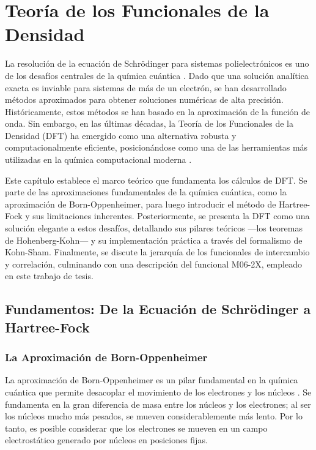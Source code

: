 
\chapter{Teoría de los Funcionales de la Densidad}
\label{chap:dft}

La resolución de la ecuación de Schrödinger para sistemas polielectrónicos es uno de los desafíos centrales de la química cuántica \cite[68]{szabo1996modern}. Dado que una solución analítica exacta es inviable para sistemas de más de un electrón, se han desarrollado métodos aproximados para obtener soluciones numéricas de alta precisión. Históricamente, estos métodos se han basado en la aproximación de la función de onda. Sin embargo, en las últimas décadas, la Teoría de los Funcionales de la Densidad (DFT) ha emergido como una alternativa robusta y computacionalmente eficiente, posicionándose como una de las herramientas más utilizadas en la química computacional moderna \cite[6]{koch2015chemist}.

Este capítulo establece el marco teórico que fundamenta los cálculos de DFT. Se parte de las aproximaciones fundamentales de la química cuántica, como la aproximación de Born-Oppenheimer, para luego introducir el método de Hartree-Fock y sus limitaciones inherentes. Posteriormente, se presenta la DFT como una solución elegante a estos desafíos, detallando sus pilares teóricos —los teoremas de Hohenberg-Kohn— y su implementación práctica a través del formalismo de Kohn-Sham. Finalmente, se discute la jerarquía de los funcionales de intercambio y correlación, culminando con una descripción del funcional M06-2X, empleado en este trabajo de tesis.

\section{Fundamentos: De la Ecuación de Schrödinger a Hartree-Fock}

\subsection{La Aproximación de Born-Oppenheimer}
La aproximación de Born-Oppenheimer es un pilar fundamental en la química cuántica que permite desacoplar el movimiento de los electrones y los núcleos \cite[p. 58]{szabo1996modern}. Se fundamenta en la gran diferencia de masa entre los núcleos y los electrones; al ser los núcleos mucho más pesados, se mueven considerablemente más lento. Por lo tanto, es posible considerar que los electrones se mueven en un campo electrostático generado por núcleos en posiciones fijas.

